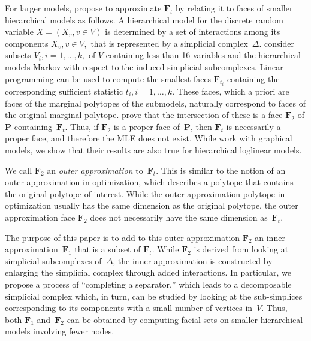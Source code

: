 \documentclass[aos,noinfoline]{imsart}
\newcommand{\Fbf}{\mathbf{F}}
\newcommand{\Pbf}{\mathbf{P}}
\theoremstyle{remark}
\theoremstyle{definition}
\begin{document}
For larger models, \citet{MassamWang15:local_approach} propose to approximate $\Fbf_t$ by relating it to faces of
smaller hierarchical models as follows.  A hierarchical model for the discrete random variable $X=(X_v, v\in V)$ is
determined by a set of interactions among its components $X_v, v\in V,$ that is represented by a simplicial
complex~$\Delta$.  \citet{MassamWang15:local_approach} consider subsets $V_i,i=1,\ldots,k,$ of $V$ containing less than
16 variables and the hierarchical models Markov with respect to the induced simplicial
subcomplexes. %
Linear programming can be used to compute the smallest faces $\Fbf_{t_i}$ containing the corresponding sufficient
statistic $t_i, i=1,\ldots,k$.  These faces, which a priori are faces of the marginal polytopes of the submodels,
naturally correspond to faces of the original marginal polytope.  \citet{MassamWang15:local_approach} prove that the
intersection of these %
is a face $\Fbf_{2}$ of $\Pbf$ containing~$\Fbf_{t}$.  Thus, if $\Fbf_{2}$ is a proper face of~$\Pbf$, then $\Fbf_{t}$
is necessarily a proper face, and therefore the MLE does not exist.  While \citet{MassamWang15:local_approach} work with
graphical models, we show that their results are also true for hierarchical loglinear
models.

We call $\Fbf_{2}$ an \emph{outer approximation} to~$\Fbf_{t}$.
%
This is similar to the notion of an outer approximation in optimization, which describes a polytope that
  contains the original polytope of interest.  While the outer approximation polytope in optimization usually has the
  same dimension as the original polytope, the outer approximation face $\Fbf_{2}$ does not necessarily have the same
  dimension as~$\Fbf_{t}$.

The purpose of this paper is to add to this outer approximation ${\mathbf F}_2$ an inner approximation~${\mathbf F}_1$ that is a subset of ${\mathbf F}_t$.
%
While $\Fbf_{2}$ is derived from looking at simplicial subcomplexes of~$\Delta$, %
the inner approximation is constructed by enlarging the simplicial complex through added interactions.  In particular, we propose a process of ``completing a separator,'' which leads to a decomposable simplicial complex which, in turn, can be studied by looking at the sub-simplices  corresponding to its components with a small number of vertices in~$V$.  Thus, both $\Fbf_{1}$ and~$\Fbf_{2}$ can be obtained by computing facial sets on smaller hierarchical models involving fewer nodes.
\end{document}
